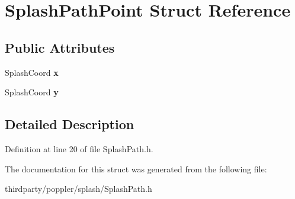 \hypertarget{struct_splash_path_point}{}\section{Splash\+Path\+Point Struct Reference}
\label{struct_splash_path_point}
\subsection*{Public Attributes}
\begin{DoxyCompactItemize}
\item 
\mbox{\label{struct_splash_path_point_a75e9e433e4efc24b00329163484e9c8e}} 
Splash\+Coord {\bfseries x}
\item 
\mbox{\label{struct_splash_path_point_aeb263b4ab8c4f59a0df350e1ea9180be}} 
Splash\+Coord {\bfseries y}
\end{DoxyCompactItemize}


\subsection{Detailed Description}


Definition at line 20 of file Splash\+Path.\+h.



The documentation for this struct was generated from the following file\+:\begin{DoxyCompactItemize}
\item 
thirdparty/poppler/splash/Splash\+Path.\+h\end{DoxyCompactItemize}
